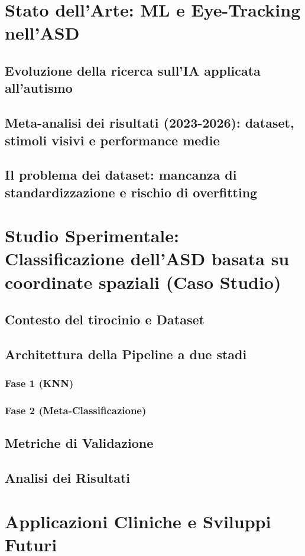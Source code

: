 \documentclass[12pt,a4paper,twoside]{book}
\begin{document}
\chapter{Stato dell'Arte: ML e Eye-Tracking nell'ASD}
\section{Evoluzione della ricerca sull'IA applicata all'autismo}
\section{Meta-analisi dei risultati (2023-2026): dataset, stimoli visivi e performance medie}
\section{Il problema dei dataset: mancanza di standardizzazione e rischio di overfitting}
\chapter{Studio Sperimentale: Classificazione dell'ASD basata su coordinate spaziali (Caso Studio)}
\section{Contesto del tirocinio e Dataset}
\section{Architettura della Pipeline a due stadi}
\subsection{Fase 1 (KNN)}
\subsection{Fase 2 (Meta-Classificazione)}
\section{Metriche di Validazione}
\section{Analisi dei Risultati}
\chapter{Applicazioni Cliniche e Sviluppi Futuri}
\end{document}

